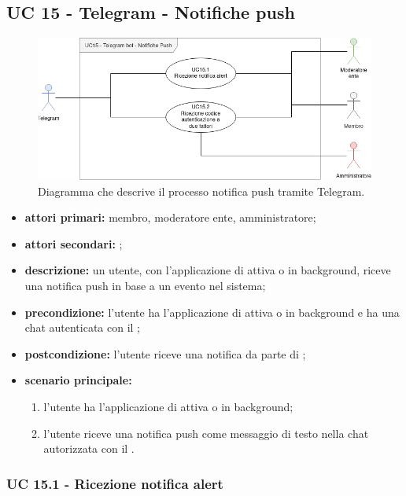\subsection{UC 15 - Telegram - Notifiche push}

	\begin{figure}[H]
		\centering
		\includegraphics[scale=0.60]{res/images/uc15}
		\caption{Diagramma che descrive il processo notifica push tramite Telegram.}
	\end{figure}

	\begin{itemize}
		\item \textbf{attori primari:} membro, moderatore ente, amministratore;
		\item \textbf{attori secondari:} ;
		\item \textbf{descrizione:} un utente, con l'applicazione di  attiva o in background, riceve una notifica push in base a un evento nel sistema;
		\item \textbf{precondizione:} l'utente ha l'applicazione di  attiva o in background e ha una chat autenticata con il ;
		\item \textbf{postcondizione:} l'utente riceve una notifica da parte di ;
		\item \textbf{scenario principale:}
		\begin{enumerate}
			\item l'utente ha l'applicazione di  attiva o in background;
			\item l'utente riceve una notifica push come messaggio di testo nella chat autorizzata con il .
		\end{enumerate}
	\end{itemize}

	\subsubsection{UC 15.1 - Ricezione notifica alert}


